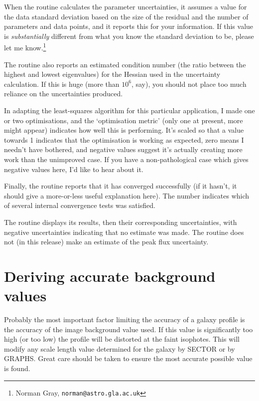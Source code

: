 \documentclass[twoside,11pt]{article}
\newcommand{\xlabel}[1]{}
\begin{document}
When the routine calculates the parameter uncertainties, it assumes a
value for the data standard deviation based on the size of the
residual and the number of parameters and data points, and it
reports this for your information.  If this value is
\emph{substantially} different from what you know the standard
deviation to be, please let me know.\footnote{Norman Gray,
\texttt{norman@astro.gla.ac.uk}}

The routine also reports an estimated condition number (the ratio
between the highest and lowest eigenvalues) for the Hessian used in
the uncertainty calculation.  If this is huge (more than $10^6$, say),
you should not place too much reliance on the uncertainties produced.

In adapting the least-squares algorithm for this particular
application, I made one or two optimisations, and the `optimisation
metric' (only one at present, more might appear) indicates how well
this is performing.  It's scaled so that a value towards 1 indicates
that the optimisation is working as expected, zero means I needn't
have bothered, and negative values suggest it's actually creating more
work than the unimproved case.  If you have a non-pathological case
which gives negative values here, I'd like to hear about it.

Finally, the routine reports that it has converged successfully (if it
hasn't, it should give a more-or-less useful explanation here).  The
number indicates which of several internal convergence tests was satisfied.

The routine displays its results, then their corresponding
uncertainties, with negative uncertainties indicating that no estimate
was made.  The routine does not (in this release) make an estimate of
the peak flux uncertainty.

\section{Deriving accurate background values}
\xlabel{ACCURATEBACKGROUNDVALUES}
\label{sec:deriving}

Probably the most important factor limiting the accuracy of a
galaxy profile is the accuracy of the image background value used.
If this value is significantly too high (or too low) the profile will
be distorted at the faint isophotes. This will modify any scale
length value determined for the galaxy by SECTOR or by GRAPHS. Great care
should be taken to ensure the most accurate possible value is found.
\end{document}
